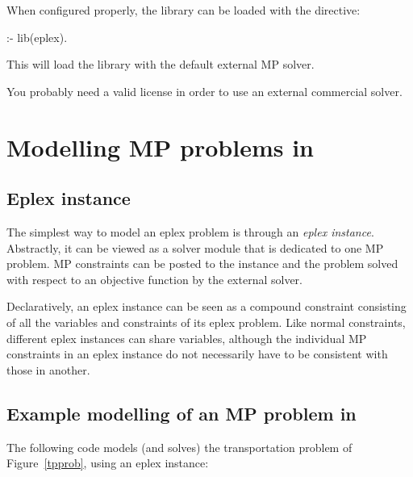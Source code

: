 
When configured properly, the library can be loaded with the directive:

\begin{code}
:- lib(eplex).
\end{code}

\noindent
This will load the library with the default external MP solver.

You probably need a valid license in order to use an external commercial solver.

\section{Modelling MP problems in {\eclipse}}
\label{mpmodelling}

\subsection{Eplex instance}

The simplest way to model an eplex problem is through an {\it eplex
instance}. Abstractly, it can be viewed as a solver module that is
dedicated to one MP problem. MP constraints can be posted to the instance 
and the problem solved with respect to an objective function by the
external solver.

Declaratively, an eplex instance can be
seen as a compound constraint consisting of all the variables and
constraints of its eplex problem. Like normal constraints, different eplex
instances can share variables, although the individual MP constraints in
an eplex instance do not necessarily have to be consistent with those in
another. 


\subsection{Example modelling of an MP problem in {\eclipse}}

The following code models (and solves) the transportation problem of
Figure~\ref{tpprob}, using an eplex instance:

